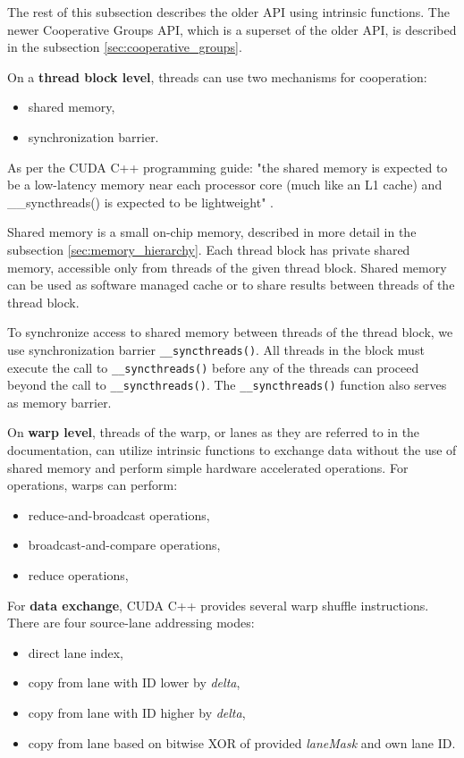 The rest of this subsection describes the older API using intrinsic functions. The newer Cooperative Groups API, which is a superset of the older API, is described in the subsection \ref{sec:cooperative_groups}.


On a \textbf{thread block level}, threads can use two mechanisms for cooperation:
\begin{itemize}
	\item shared memory,
	\item synchronization barrier.
\end{itemize}

As per the CUDA C++ programming guide: 
"the shared memory is expected to be a low-latency memory near each processor core (much like an L1 cache) and \_\_syncthreads() is expected to be lightweight" \citep{site:cuda}.

Shared memory is a small on-chip memory, described in more detail in the subsection \ref{sec:memory_hierarchy}. Each thread block has private shared memory, accessible only from threads of the given thread block. Shared memory can be used as software managed cache or to share results between threads of the thread block. 

To synchronize access to shared memory between threads of the thread block, we use synchronization barrier \texttt{\_\_syncthreads()}. All threads in the block must execute the call to \texttt{\_\_syncthreads()} before any of the threads can proceed beyond the call to \texttt{\_\_syncthreads()}. 
The \texttt{\_\_syncthreads()} function also serves as memory barrier. %

On \textbf{warp level}, threads of the warp, or lanes as they are referred to in the documentation, can utilize intrinsic functions to exchange data without the use of shared memory and perform simple hardware accelerated operations. For operations, warps can perform:
\begin{itemize}
	\item reduce-and-broadcast operations,
	\item broadcast-and-compare operations,
	\item reduce operations,
\end{itemize}

For \textbf{data exchange}, CUDA C++ provides several warp shuffle instructions. There are four source-lane addressing modes:
\begin{itemize}
	\item direct lane index,
	\item copy from lane with ID lower by \textit{delta},
	\item copy from lane with ID higher by \textit{delta},
	\item copy from lane based on bitwise XOR of provided \textit{laneMask} and own lane ID. 
\end{itemize}

